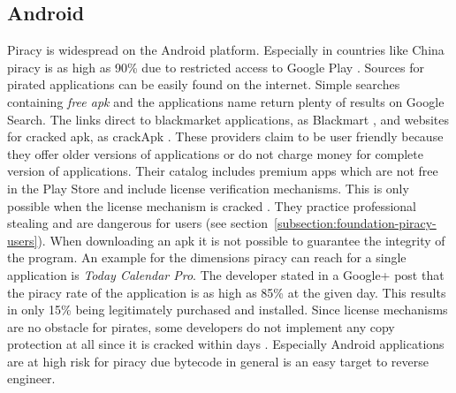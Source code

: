 \subsection{Android} \label{subsection:foundation-piracy-android}
Piracy is widespread on the Android platform. Especially in countries like China piracy is as high as 90\% due to restricted access to Google Play \cite{piracyRate}.
Sources for pirated applications can be easily found on the internet.
Simple searches containing \textit{free apk} and the applications name return plenty of results on Google Search.
The links direct to blackmarket applications, as Blackmart \cite{blackmartStore}, and websites for cracked \gls{apk}, as crackApk \cite{crackApk}.
These providers claim to be user friendly because they offer older versions of applications or do not charge money for complete version of applications.
Their catalog includes premium apps which are not free in the Play Store and include license verification mechanisms.
This is only possible when the license mechanism is cracked \cite{apksfree}.
They practice professional stealing and are dangerous for users (see section~\ref{subsection:foundation-piracy-users}).
When downloading an \gls{apk} it is not possible to guarantee the integrity of the program.
\newline
An example for the dimensions piracy can reach for a single application is \textit{Today Calendar Pro}.
The developer stated in a Google+ post that the piracy rate of the application is as high as 85\% at the given day.
This results in only 15\% being legitimately purchased and installed. \cite{xdaPiracy}\cite{developersPiracy}
\newline
Since license mechanisms are no obstacle for pirates, some developers do not implement any copy protection at all since it is cracked within days \cite{recodeMonument}.
Especially Android applications are at high risk for piracy due bytecode in general is an easy target to reverse engineer.


%




%

